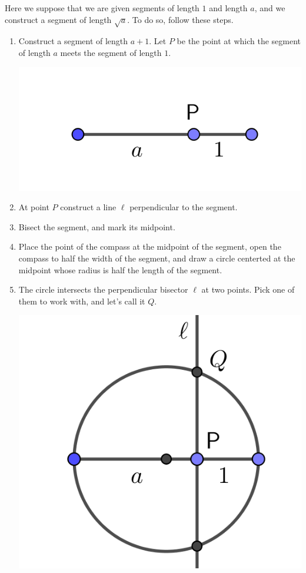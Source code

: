 \documentclass[11pt]{article}
\newenvironment{task}
	{\begin{mdframed}[linecolor=lightgray, linewidth=3pt]\raggedright}
	{\end{mdframed}}
\theoremstyle{definition}
\begin{document}
\begin{task}
  Here we suppose that we are given segments of length $1$ and length $a$, and we construct a segment of length $\sqrt{a}$. To do so, follow these
  steps.
  \begin{enumerate}
    \item Construct a segment of length $a+1$. Let $P$ be the point at which the segment of length $a$ meets the segment of length $1$.
  \begin{center}
    \includegraphics[scale=.75]{Images/square_roots_1.png}
  \end{center}
    \item At point $P$ construct a line $\ell$ perpendicular to the segment.
    \item Bisect the segment, and mark its midpoint.
    \item Place the point of the compass at the midpoint of the segment, open the compass to half the width of the segment, and draw a circle 
      centerted at the midpoint whose radius is half the length of the segment.
    \item The circle intersects the perpendicular bisector $\ell$ at two points. Pick one of them to work with, and let's call it $Q$.
  \begin{center}
    \includegraphics[scale=.75]{Images/square_roots_3.png}

\end{center}
\end{enumerate}
\end{task}
\end{document}
